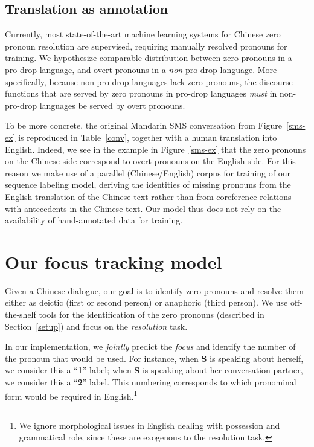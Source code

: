 \documentclass[11pt]{report}
\newcommand{\speaker}[1]{{\bf\footnotesize\textsf{#1}}}
\begin{document}
\subsection{Translation as annotation} \label{taa}

Currently, most state-of-the-art machine learning systems for Chinese zero pronoun resolution are supervised, requiring manually resolved pronouns for training.
We hypothesize comparable distribution between zero pronouns in a pro-drop language, and overt pronouns in a \emph{non}-pro-drop language. More specifically, because non-pro-drop languages lack zero pronouns, the discourse functions that are served by zero pronouns in pro-drop languages \emph{must} in non-pro-drop languages be served by overt pronouns.

To be more concrete, the original Mandarin SMS conversation from Figure~\ref{sms-ex} is reproduced in Table~\ref{conv}, together with a human translation into English.
Indeed, we see in the example in Figure~\ref{sms-ex} that the zero pronouns on the Chinese side correspond to overt pronouns on the English side. For this reason we make use of a parallel (Chinese/English) corpus for training of our sequence labeling model, deriving the identities of missing pronouns from the English translation of the Chinese text rather than from coreference relations with antecedents in the Chinese text. Our model thus does not rely on the availability of hand-annotated data for training. 

\section{Our focus tracking model}\label{model}

Given a Chinese dialogue, our goal is to identify zero pronouns and resolve them either as deictic (first or second person) or anaphoric (third person). We use off-the-shelf tools for the identification of the zero pronouns (described in Section~\ref{setup}) and focus on the \emph{resolution} task.

In our implementation, we \emph{jointly} predict the \emph{focus} and identify the number of the pronoun that would be used. For instance, when \speaker{S} is speaking about herself, we consider this a ``\textbf{1}'' label; when \speaker{S} is speaking about her conversation partner, we consider this a ``\textbf{2}'' label. This numbering corresponds to which pronominal form would be required in English.\footnote{We ignore morphological issues in English dealing with possession and grammatical role, since these are exogenous to the resolution task.}
\end{document}
